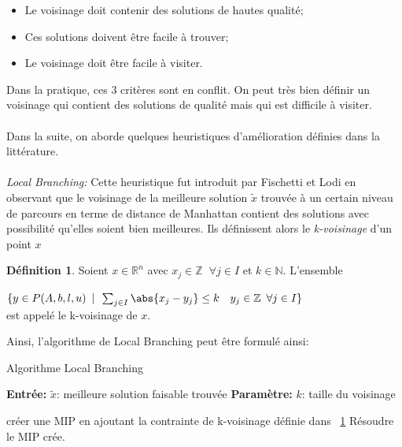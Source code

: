 \documentclass[12pt,a4paper,oneside]{book}
\theoremstyle{definition}
\newtheorem{definition}{Définition}[section]
\newcommand{\R}{\mathbb{R}}
\newcommand{\N}{\mathbb{N}}
\newcommand{\Z}{\mathbb{Z}}
\begin{document}
	\begin{itemize}
		\item[] Le voisinage doit contenir des solutions de hautes qualité;
		\item[] Ces solutions doivent être facile à trouver;
		\item[] Le voisinage doit être facile à visiter.
	\end{itemize}
	\vspace{5pt}
	Dans la pratique, ces 3 critères sont en conflit. On peut très bien définir un voisinage qui contient des solutions de qualité mais qui est difficile à visiter.
	\paragraph{}
	Dans la suite, on aborde quelques heuristiques d'amélioration définies dans la littérature.
	
	\paragraph{}
	\textit{Local Branching:} Cette heuristique fut introduit par Fischetti et Lodi \cite{fischetti2003local} en observant que le voisinage de la meilleure solution $\tilde{x}$ trouvée à un certain niveau de parcours en terme de distance de Manhattan contient des solutions avec possibilité qu'elles soient bien meilleures. Ils définissent alors le \textit{k-voisinage} d'un point $x$
	\begin{definition} \label{def:kneighborhood}
		Soient $ x \in \R^n$ avec $ x_j \in \Z \hspace{7pt} \forall j \in I $ et $k \in \N$. L'ensemble

		\vspace{12pt}

		$\{ y \in P(A,b,l,u) \hspace{5pt} | \hspace{5pt} \sum_{j \in I} \abs{x_j - y_j} \leq k \hspace{10pt} y_j \in \Z \hspace{5pt} \forall j \in I \}$ \\
		
		
		est appelé le k-voisinage de $x$.
		 
	\end{definition}

	Ainsi, l'algorithme de Local Branching peut être formulé ainsi:
	
	\begin{algorithm}
		\caption{Algorithme Local Branching}
		\SetAlgoLined
		\DontPrintSemicolon
		
		\textbf{Entrée:} 	$\tilde{x}$: meilleure solution faisable trouvée \;
		\textbf{Paramètre:} $k$: taille du voisinage \;
						 
		
		créer une MIP en ajoutant la contrainte de k-voisinage définie dans ~\ref{def:kneighborhood} \;
		Résoudre le MIP crée.
		
	\end{algorithm}
		
\end{document}
